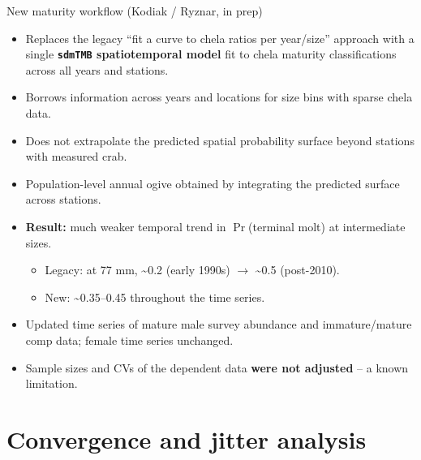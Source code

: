 \documentclass[
  10pt,
  ignorenonframetext,
  aspectratio=169,
]{beamer}
\providecommand{\tightlist}{%
  \setlength{\itemsep}{0pt}\setlength{\parskip}{0pt}}
\begin{document}
\begin{frame}[fragile]{New maturity workflow (Kodiak / Ryznar, in prep)}
\label{new-maturity-workflow-kodiak-ryznar-in-prep}
\small

\begin{itemize}
\tightlist
\item
  Replaces the legacy ``fit a curve to chela ratios per year/size''
  approach with a single \textbf{\texttt{sdmTMB} spatiotemporal model}
  fit to chela maturity classifications across all years and stations.
\item
  Borrows information across years and locations for size bins with
  sparse chela data.
\item
  Does not extrapolate the predicted spatial probability surface beyond
  stations with measured crab.
\item
  Population-level annual ogive obtained by integrating the predicted
  surface across stations.
\item
  \textbf{Result:} much weaker temporal trend in \(\Pr\)(terminal molt)
  at intermediate sizes.

  \begin{itemize}
  \tightlist
  \item
    Legacy: at 77 mm, \textasciitilde0.2 (early 1990s) \(\rightarrow\)
    \textasciitilde0.5 (post-2010).
  \item
    New: \textasciitilde0.35--0.45 throughout the time series.
  \end{itemize}
\item
  Updated time series of mature male survey abundance and
  immature/mature comp data; female time series unchanged.
\item
  Sample sizes and CVs of the dependent data \textbf{were not adjusted}
  -- a known limitation.
\end{itemize}
\end{frame}

\section{Convergence and jitter
analysis}\label{convergence-and-jitter-analysis}
\end{document}
